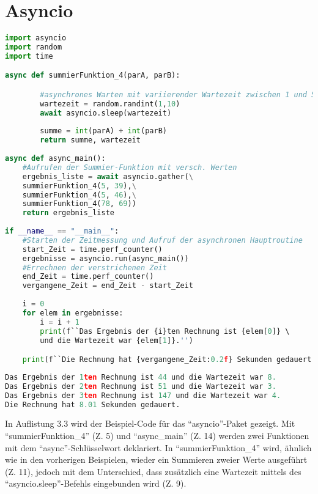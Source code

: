 \section{Asyncio}
\begin{lstlisting}[language=Python,caption={Beispiel f"ur die Verwendung von Asyncio},captionpos=b]
import asyncio
import random
import time

async def summierFunktion_4(parA, parB):

        #asynchrones Warten mit variierender Wartezeit zwischen 1 und 5s
        wartezeit = random.randint(1,10)
        await asyncio.sleep(wartezeit)
        
        summe = int(parA) + int(parB)    
        return summe, wartezeit
        
async def async_main():
    #Aufrufen der Summier-Funktion mit versch. Werten
    ergebnis_liste = await asyncio.gather(\
    summierFunktion_4(5, 39),\
    summierFunktion_4(5, 46),\
    summierFunktion_4(78, 69))
    return ergebnis_liste
    
if __name__ == "__main__":
    #Starten der Zeitmessung und Aufruf der asynchronen Hauptroutine
    start_Zeit = time.perf_counter()
    ergebnisse = asyncio.run(async_main())
    #Errechnen der verstrichenen Zeit 
    end_Zeit = time.perf_counter()
    vergangene_Zeit = end_Zeit - start_Zeit
    
    i = 0       
    for elem in ergebnisse:
        i = i + 1
        print(f``Das Ergebnis der {i}ten Rechnung ist {elem[0]} \ 
        und die Wartezeit war {elem[1]}.'')

    print(f``Die Rechnung hat {vergangene_Zeit:0.2f} Sekunden gedauert.'')
\end{lstlisting}
\begin{lstlisting}[language=Python,caption={Ausgabe in IDLE bei Asyncio-Beispiel},captionpos=b]
Das Ergebnis der 1ten Rechnung ist 44 und die Wartezeit war 8.
Das Ergebnis der 2ten Rechnung ist 51 und die Wartezeit war 3.
Das Ergebnis der 3ten Rechnung ist 147 und die Wartezeit war 4.
Die Rechnung hat 8.01 Sekunden gedauert.
\end{lstlisting}
\newpage
In Auflistung 3.3 wird der Beispiel-Code für das ``asyncio''-Paket gezeigt. Mit ``summierFunktion\_4'' (Z. 5) und ``async\_main'' (Z. 14) werden zwei Funktionen mit dem ``async''-Schlüsselwort deklariert. 
In ``summierFunktion\_4'' wird, ähnlich wie in den vorherigen Beispielen, wieder ein Summieren zweier Werte ausgeführt (Z. 11), jedoch mit dem Unterschied, dass zusätzlich eine Wartezeit mittels des ``asyncio.sleep''-Befehls eingebunden wird (Z. 9). 
